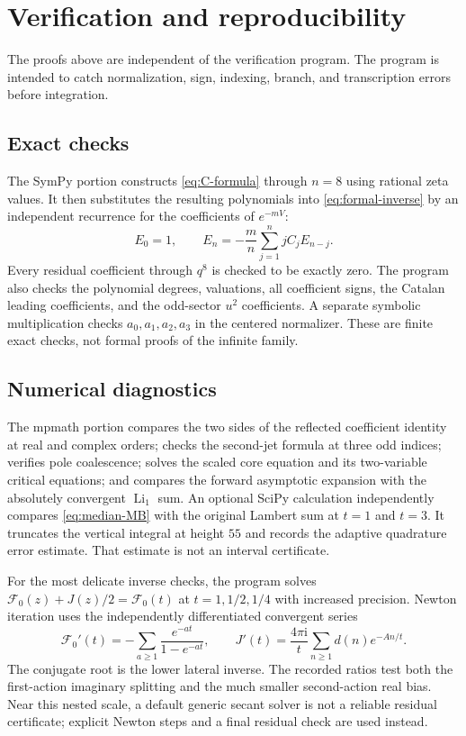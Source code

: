 \documentclass[11pt,a4paper]{article}
\numberwithin{equation}{section}
\theoremstyle{definition}\newtheorem{definition}[theorem]{Definition}
\theoremstyle{remark}\newtheorem{remark}[theorem]{Remark}
\newcommand{\Li}{\operatorname{Li}}
\newcommand{\ii}{\mathrm i}
\newcommand{\F}{\mathcal F}\newcommand{\CC}{\mathcal C}
\begin{document}
\section{Verification and reproducibility}
\label{sec:verification}
The proofs above are independent of the verification program. The
program is intended to catch normalization, sign, indexing, branch,
and transcription errors before integration.

\subsection{Exact checks}
The SymPy portion constructs \eqref{eq:C-formula} through $n=8$ using
rational zeta values. It then substitutes the resulting polynomials
into \eqref{eq:formal-inverse} by an independent recurrence for the
coefficients of $e^{-mV}$:
\[
 E_0=1,\qquad
 E_n=-\frac mn\sum_{j=1}^n jC_j E_{n-j}.
\]
Every residual coefficient through $q^8$ is checked to be exactly zero.
The program also checks the polynomial degrees, valuations, all
coefficient signs, the Catalan leading coefficients, and the
odd-sector $u^2$ coefficients. A separate symbolic multiplication
checks $a_0,a_1,a_2,a_3$ in the centered normalizer. These are finite
exact checks, not formal proofs of the infinite family.

\subsection{Numerical diagnostics}
The mpmath portion compares the two sides of the reflected coefficient
identity at real and complex orders; checks the second-jet formula at
three odd indices; verifies pole coalescence; solves the scaled core
equation and its two-variable critical equations; and compares the
forward asymptotic expansion with the absolutely convergent
$\Li_1$ sum. An optional SciPy calculation independently compares
\eqref{eq:median-MB} with the original Lambert sum at $t=1$ and
$t=3$. It truncates the vertical integral at height $55$ and records
the adaptive quadrature error estimate. That estimate is not an
interval certificate.

For the most delicate inverse checks, the program solves
$\F_0(z)+J(z)/2=\F_0(t)$ at $t=1,1/2,1/4$ with increased precision.
Newton iteration uses the independently differentiated convergent
series
\begin{equation}\label{eq:numeric-derivatives}
 \F_0'(t)=-\sum_{a\ge1}\frac{e^{-at}}{1-e^{-at}},\qquad
 J'(t)=\frac{4\pi\ii}{t}\sum_{n\ge1}d(n)e^{-An/t}.
\end{equation}
The conjugate root is the lower lateral inverse. The recorded ratios
test both the first-action imaginary splitting and the much smaller
second-action real bias. Near this nested scale, a default generic
secant solver is not a reliable residual certificate; explicit Newton
steps and a final residual check are used instead.
\end{document}
